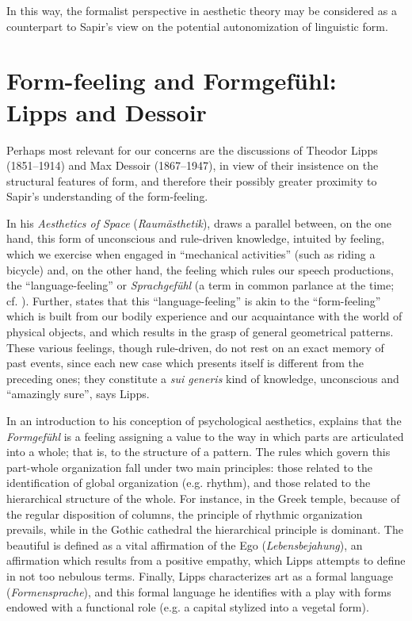 \documentclass[output=paper]{langscibook}
\begin{document}
In this way, the formalist perspective in aesthetic theory may be considered as a counterpart to Sapir's view on the potential autonomization of linguistic form.

\section{Form-feeling and Formgefühl: Lipps and Dessoir}
\label{sec:fortis:lippsdessoir}

Perhaps most relevant for our concerns are the discussions of Theodor Lipps (1851--1914) and Max Dessoir (1867--1947), in view of their insistence on the structural features of form, and therefore their possibly greater proximity to Sapir's understanding of the form-feeling.

In his \emph{Aesthetics of Space} (\emph{Raumästhetik}), \citet{Lipps1897} draws a parallel between, on the one hand, this form of unconscious and rule-driven knowledge, intuited by feeling, which we exercise when engaged in ``mechanical activities'' (such as riding a bicycle) and, on the other hand, the feeling which rules our speech productions, the ``language-feeling'' or \emph{Sprachgefühl} (a term in common parlance at the time; cf. \citealt{Tchougounnikov}). Further, \citet[chap. 8]{Lipps1897} states that this ``language-feeling'' is akin to the ``form-feeling'' which is built from our bodily experience and our acquaintance with the world of physical objects, and which results in the grasp of general geometrical patterns. These various feelings, though rule-driven, do not rest on an exact memory of past events, since each new case which presents itself is different from the preceding ones; they constitute a \emph{sui generis} kind of knowledge, unconscious and ``amazingly sure'', says Lipps.

In an introduction to his conception of psychological aesthetics, \citet{Lipps1907} explains that the \emph{Formgefühl} is a feeling assigning a value to the way in which parts are articulated into a whole; that is, to the structure of a pattern. The rules which govern this part-whole organization fall under two main principles: those related to the identification of global organization (e.g. rhythm), and those related to the hierarchical structure of the whole. For instance, in the Greek temple, because of the regular disposition of columns, the principle of rhythmic organization prevails, while in the Gothic cathedral the hierarchical principle is dominant. The beautiful is defined as a vital affirmation of the Ego (\emph{Lebensbejahung}), an affirmation which results from a positive empathy, which Lipps attempts to define in not too nebulous terms. Finally, Lipps characterizes art as a formal language (\emph{Formensprache}), and this formal language he identifies with a play with forms endowed with a functional role (e.g. a capital stylized into a vegetal form).
\end{document}
